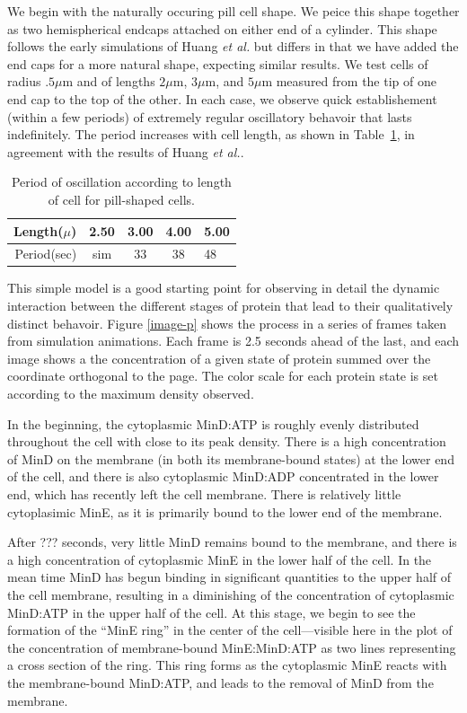 \documentclass[letterpaper,twocolumn,amsmath,amssymb,pre]{revtex4-1}
\newcommand\micron{\ensuremath{\mu\text{m}}}
\begin{document}
We begin with the naturally occuring pill cell shape.  We peice this
shape together as two hemispherical endcaps attached on either end of
a cylinder.  This shape follows the early simulations of Huang
\emph{et al.} but differs in that we have added the end caps for a
more natural shape, expecting similar results.  We test cells of
radius $.5\micron$ and of lengths $2\micron$, $3\micron$, and
$5\micron$ measured from the tip of one end cap to the top of the
other. In each case, we observe quick establishement (within a few
periods) of extremely regular oscillatory behavoir that lasts
indefinitely.  The period increases with cell length, as shown in
Table~\ref{tab:pill-periods}, in agreement with the results of Huang
\emph{et al.}.

\begin{table}
  \begin{tabular}{|r|c|c|c|l|}
    \hline
    Length($\mu$) & 2.50 & 3.00 & 4.00 & 5.00\\
    \hline
    Period(sec) & sim & 33 & 38 & 48 \\ \cline{2-2}
    \hline
  \end{tabular}
  \caption{Period of oscillation according to length of cell for
    pill-shaped cells.}\label{tab:pill-periods}
\end{table}

This simple model is a good starting point for observing in detail the
dynamic interaction between the different stages of protein that lead
to their qualitatively distinct behavoir. Figure \ref{image-p} shows
the process in a series of frames taken from simulation animations.
Each frame is 2.5 seconds ahead of the last, and each image shows a
the concentration of a given state of protein summed over the
coordinate orthogonal to the page.  The color scale for each protein
state is set according to the maximum density observed.

In the beginning, the cytoplasmic MinD:ATP is roughly evenly
distributed throughout the cell with close to its peak density.  There
is a high concentration of MinD on the membrane (in both its
membrane-bound states) at the lower end of the cell, and there is also
cytoplasmic MinD:ADP concentrated in the lower end, which has recently
left the cell membrane.   There is relatively little cytoplasimic
MinE, as it is primarily bound to the lower end of the membrane.

After ??? seconds, very little MinD remains bound to the membrane, and
there is a high concentration of cytoplasmic MinE in the lower half of
the cell.  In the mean time MinD has begun binding in significant
quantities to the upper half of the cell membrane, resulting in a
diminishing of the concentration of cytoplasmic MinD:ATP in the upper
half of the cell.  At this stage, we begin to see the formation of the
``MinE ring'' in the center of the cell---visible here in the plot of
the concentration of membrane-bound MinE:MinD:ATP as two lines
representing a cross section of the ring.  This ring forms as the
cytoplasmic MinE reacts with the membrane-bound MinD:ATP, and leads to
the removal of MinD from the membrane.
\end{document}
